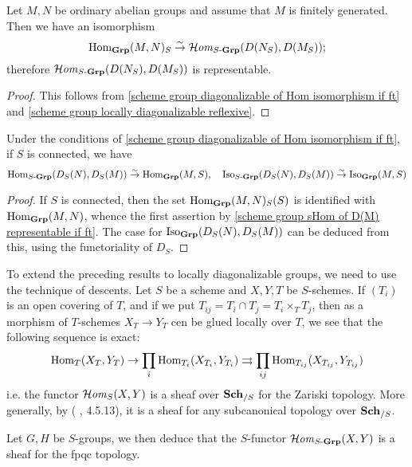 \begin{corollary}\label{scheme group sHom of D(M) representable if ft}
Let $M,N$ be ordinary abelian groups and assume that $M$ is finitely generated. Then we have an isomorphism
\[\mathrm{Hom}_{\mathbf{Grp}}(M,N)_S\stackrel{\sim}{\to} \operatorname{\mathcal{H}\hspace*{-0.4pt}\textit{om}\hspace{0.5pt}}_{S\textup{-}\mathbf{Grp}}(D(N_S),D(M_S));\]
therefore $\operatorname{\mathcal{H}\hspace*{-0.4pt}\textit{om}\hspace{0.5pt}}_{S\textup{-}\mathbf{Grp}}(D(N_S),D(M_S))$ is representable.
\end{corollary}
\begin{proof}
This follows from \cref{scheme group diagonalizable of Hom isomorphism if ft} and \cref{scheme group locally diagonalizable reflexive}.
\end{proof}

\begin{corollary}\label{scheme group sHom of D(M) over connected base char}
Under the conditions of \cref{scheme group diagonalizable of Hom isomorphism if ft}, if $S$ is connected, we have
\[\mathrm{Hom}_{S\textup{-}\mathbf{Grp}}(D_S(N),D_S(M))\stackrel{\sim}{\to}\mathrm{Hom}_{\mathbf{Grp}}(M,S),\quad \mathrm{Iso}_{S\textup{-}\mathbf{Grp}}(D_S(N),D_S(M))\stackrel{\sim}{\to}\mathrm{Iso}_{\mathbf{Grp}}(M,S)\]
\end{corollary}
\begin{proof}
If $S$ is connected, then the set $\mathrm{Hom}_{\mathbf{Grp}}(M,N)_S(S)$ is identified with $\mathrm{Hom}_{\mathbf{Grp}}(M,N)$, whence the first assertion by \cref{scheme group sHom of D(M) representable if ft}. The case for $\mathrm{Iso}_{\mathbf{Grp}}(D_S(N),D_S(M))$ can be deduced from this, using the functoriality of $D_S$.
\end{proof}

To extend the preceding results to locally diagonalizable groups, we need to use the technique of descents. Let $S$ be a scheme and $X,Y,T$ be $S$-schemes. If $(T_i)$ is an open covering of $T$, and if we put $T_{ij}=T_i\cap T_j=T_i\times_TT_j$, then as a morphism of $T$-schemes $X_T\to Y_T$ cen be glued locally over $T$, we see that the following sequence is exact:
\begin{equation}\label{scheme sHom functor is sheaf}
\mathrm{Hom}_T(X_T,Y_T)\to\prod_i\mathrm{Hom}_{T_i}(X_{T_i},Y_{T_i})\rightrightarrows\prod_{ij}\mathrm{Hom}_{T_{ij}}(X_{T_{ij}},Y_{T_{ij}})
\end{equation}
i.e. the functor $\operatorname{\mathcal{H}\hspace*{-0.4pt}\textit{om}\hspace{0.5pt}}_S(X,Y)$ is a sheaf over $\mathbf{Sch}_{/S}$ for the Zariski topology. More generally, by (\cite{SGA3-1} , 4.5.13), it is a sheaf for any subcanonical topology over $\mathbf{Sch}_{/S}$.\par
Let $G,H$ be $S$-groups, we then deduce that the $S$-functor $\operatorname{\mathcal{H}\hspace*{-0.4pt}\textit{om}\hspace{0.5pt}}_{S\textup{-}\mathbf{Grp}}(X,Y)$ is a sheaf for the fpqc topology.

